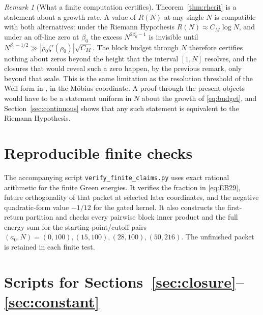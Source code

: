 \documentclass[11pt]{article}
\theoremstyle{definition}
\theoremstyle{remark}
\newtheorem{remark}[theorem]{Remark}
\begin{document}
\begin{remark}[What a finite computation certifies]
Theorem~\ref{thm:rhcrit} is a statement about a growth rate. A value of $R(N)$ at any single $N$ is compatible with both alternatives: under the Riemann Hypothesis $R(N)\approx C_M\log N$, and under an off-line zero at $\beta_0$ the excess $N^{2\beta_0-1}$ is invisible until $N^{\beta_0-1/2}\gg|\rho_0\zeta'(\rho_0)|\sqrt{C_M}$. The block budget through $N$ therefore certifies nothing about zeros beyond the height that the interval $[1,N]$ resolves, and the closures that would reveal such a zero happen, by the previous remark, only beyond that scale. This is the same limitation as the resolution threshold of the Weil form in \cite{michaels-folds,zhu}, in the M\"obius coordinate. A proof through the present objects would have to be a statement uniform in $N$ about the growth of \eqref{eq:budget}, and Section~\ref{sec:continuous} shows that any such statement is equivalent to the Riemann Hypothesis.
\end{remark}

\appendix
\section{Reproducible finite checks}

The accompanying script \texttt{verify\_finite\_claims.py} uses exact rational arithmetic for the finite Green energies. It verifies the fraction in \eqref{eq:EB29}, future orthogonality of that packet at selected later coordinates, and the negative quadratic-form value $-1/12$ for the gated kernel. It also constructs the first-return partition and checks every pairwise block inner product and the full energy sum for the starting-point/cutoff pairs $(a_0,N)=(0,100),(15,100),(28,100),(50,216)$. The unfinished packet is retained in each finite test.

\section{Scripts for Sections~\ref{sec:closure}--\ref{sec:constant}}\label{app:scripts}
\end{document}
